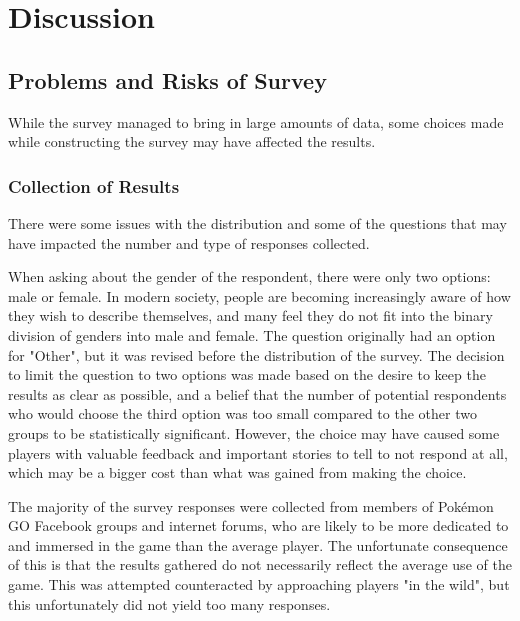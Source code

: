 
\chapter{Discussion}
\label{chapter:discussion}

\section{Problems and Risks of Survey}
\label{sec:problems-with-survey}

While the survey managed to bring in large amounts of data, some choices made while constructing the survey may have affected the results.

\subsection{Collection of Results}

There were some issues with the distribution and some of the questions that may have impacted the number and type of responses collected.

When asking about the gender of the respondent, there were only two options: male or female. In modern society, people are becoming increasingly aware of how they wish to describe themselves, and many feel they do not fit into the binary division of genders into male and female. The question originally had an option for "Other", but it was revised before the distribution of the survey. The decision to limit the question to two options was made based on the desire to keep the results as clear as possible, and a belief that the number of potential respondents who would choose the third option was too small compared to the other two groups to be statistically significant. However, the choice may have caused some players with valuable feedback and important stories to tell to not respond at all, which may be a bigger cost than what was gained from making the choice. 

The majority of the survey responses were collected from members of Pokémon GO Facebook groups and internet forums, who are likely to be more dedicated to and immersed in the game than the average player. The unfortunate consequence of this is that the results gathered do not necessarily reflect the average use of the game. This was attempted counteracted by approaching players "in the wild", but this unfortunately did not yield too many responses. 

